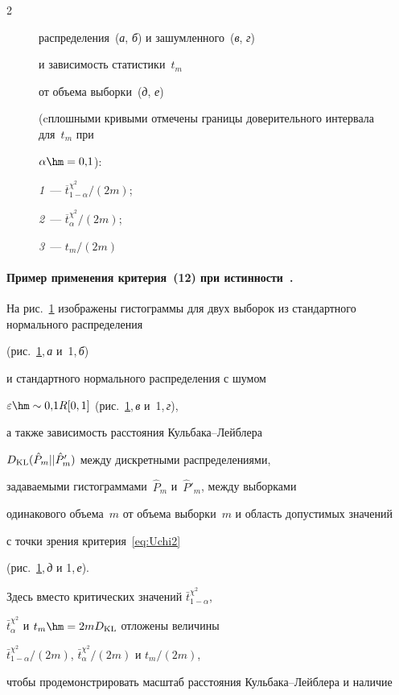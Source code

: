 \begin{multicols}{2}
\begin{figure}
{распределения~(\textit{а}, \textit{б}) и зашумленного~(\textit{в}, \textit{г})

и зависимость статистики~$t_m$

от объема выборки~(\textit{д}, \textit{е})

(cплошными кривыми отмечены границы доверительного интервала для~$t_m$ при

$\alpha \hm= 0{,}1$):

\textit{1}~--- $\overline{t}_{1-\alpha}^{\chi^2}/(2m)$;

\textit{2}~--- $\overline{t}_\alpha^{\chi^2}/(2m)$;

\textit{3}~--- $t_m/(2m)$}\label{fg:norm}

\end{figure}



\paragraph*{Пример применения критерия~(12) при истин\-ности~{}.}

На рис.~\ref{fg:norm} изображены гистограммы для двух выборок из стандартного нормального распределения

(рис.~\ref{fg:norm},\,\textit{а} и~1,\,\textit{б})

и стандартного нормального распределения с шумом

$\varepsilon\hm\sim 0{,}1{R}[0,1]$ (рис.~\ref{fg:norm},\,\textit{в} и~1,\,\textit{г}),

а также зависимость расстояния Кульбака--Лейблера

$D_{\mathrm{KL}}(\hat{P}_{m}||\hat{P}'_{m})$ между дискретными распределениями,

задаваемыми гистограммами~$\hat{P}_{m}$ и~$\hat{P}'_{m}$, между выборками

одинакового объема~$m$  от объема выборки~$m$ и область допустимых значений

с точки зрения критерия~\eqref{eq:Uchi2}

(рис.~\ref{fg:norm},\,\textit{д} и 1,\,\textit{е}).

Здесь вместо критических значений $\bar{t}^{\chi^2}_{1-\alpha}$,

$\bar{t}^{\chi^2}_{\alpha}$ и $t_m \hm= 2m{D}_{\KL}$ отложены величины

$\bar{t}^{\chi^2}_{1-\alpha}/(2m)$,  $\bar{t}^{\chi^2}_{\alpha}/(2m)$ и $t_m/(2m)$,

чтобы продемонстрировать масштаб расстояния Кульбака--Лейблера и наличие


\end{multicols}
